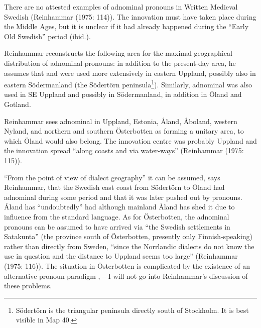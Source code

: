 There are no attested examples of adnominal pronouns in Written Medieval Swedish (Reinhammar (1975: 114)). The innovation must have taken place during the Middle Ages, but it is unclear if it had already happened during the “Early Old Swedish” period (ibid.).

Reinhammar reconstructs the following area for the maximal geographical distribution of adnominal pronouns: in addition to the present-day area, he assumes that  and  were used more extensively in eastern Uppland, possibly also in eastern Södermanland (the Södertörn peninsula\footnote{ Södertörn is the triangular peninsula directly south of Stockholm. It is best visible in Map 40.}). Similarly, adnominal was also used in SE Uppland and possibly in Södermanland, in addition in Öland and Gotland. 

Reinhammar sees adnominal in Uppland, Estonia, Åland, Åboland, western Nyland, and northern and southern Österbotten as forming a unitary area, to which Öland would also belong. The innovation centre was probably Uppland and the innovation spread “along coasts and via water-ways” (Reinhammar (1975: 115)).

“From the point of view of dialect geography” it can be assumed, says Reinhammar, that the Swedish east coast from Södertörn to Öland had adnominal  during some period and that it was later pushed out by pronouns. Åland has “undoubtedly” had although mainland Åland has shed it due to influence from the standard language. As for Österbotten, the adnominal pronouns can be assumed to have arrived via “the Swedish settlements in Satakunta” (the province south of Österbotten, presently only Finnish-speaking) rather than directly from Sweden, “since the Norrlandic dialects do not know the use in question and the distance to Uppland seems too large” (Reinhammar (1975: 116)). The situation in Österbotten is complicated by the existence of an alternative pronoun paradigm ,  – I will not go into Reinhammar’s discussion of these problems. 

